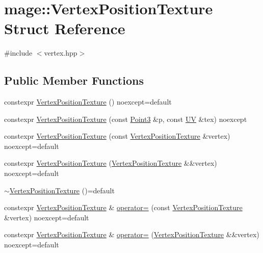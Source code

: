 \hypertarget{structmage_1_1_vertex_position_texture}{}\section{mage\+:\+:Vertex\+Position\+Texture Struct Reference}
\label{structmage_1_1_vertex_position_texture}


{\ttfamily \#include $<$vertex.\+hpp$>$}

\subsection*{Public Member Functions}
\begin{DoxyCompactItemize}
\item 
constexpr \hyperlink{structmage_1_1_vertex_position_texture_a379985c00ba410c173e1e1c269ae33ee}{Vertex\+Position\+Texture} () noexcept=default
\item 
constexpr \hyperlink{structmage_1_1_vertex_position_texture_a3370852aca7ddbcb58f9c0629683649b}{Vertex\+Position\+Texture} (const \hyperlink{structmage_1_1_point3}{Point3} \&p, const \hyperlink{structmage_1_1_u_v}{UV} \&tex) noexcept
\item 
constexpr \hyperlink{structmage_1_1_vertex_position_texture_a307510d9872cb526330751e6f7605907}{Vertex\+Position\+Texture} (const \hyperlink{structmage_1_1_vertex_position_texture}{Vertex\+Position\+Texture} \&vertex) noexcept=default
\item 
constexpr \hyperlink{structmage_1_1_vertex_position_texture_a0541fd3614929d9a75ba172f7d3995e7}{Vertex\+Position\+Texture} (\hyperlink{structmage_1_1_vertex_position_texture}{Vertex\+Position\+Texture} \&\&vertex) noexcept=default
\item 
\hyperlink{structmage_1_1_vertex_position_texture_abafd9b5ff2067834916b522d58b5764f}{$\sim$\+Vertex\+Position\+Texture} ()=default
\item 
constexpr \hyperlink{structmage_1_1_vertex_position_texture}{Vertex\+Position\+Texture} \& \hyperlink{structmage_1_1_vertex_position_texture_ad58b6157a9ec702b42a56037db1d41d3}{operator=} (const \hyperlink{structmage_1_1_vertex_position_texture}{Vertex\+Position\+Texture} \&vertex) noexcept=default
\item 
constexpr \hyperlink{structmage_1_1_vertex_position_texture}{Vertex\+Position\+Texture} \& \hyperlink{structmage_1_1_vertex_position_texture_a0f4ffdfe65108d6bac7c2688bcd8f91d}{operator=} (\hyperlink{structmage_1_1_vertex_position_texture}{Vertex\+Position\+Texture} \&\&vertex) noexcept=default
\end{DoxyCompactItemize}
